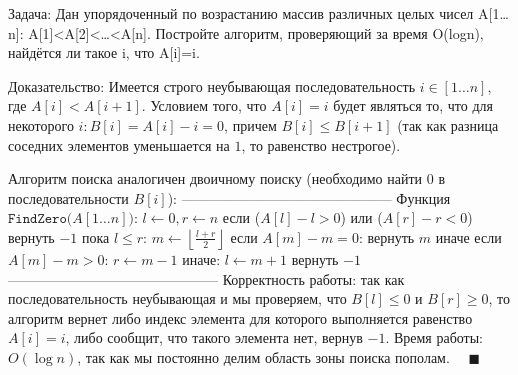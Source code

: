 Задача:
Дан упорядоченный по возрастанию массив различных целых чисел A[1…n]: A[1]<A[2]<…<A[n].
Постройте алгоритм, проверяющий за время O(logn), найдётся ли такое i, что A[i]=i.

Доказательство:
Имеется строго неубывающая последовательность $i \in [1 \ldots n]$, где $A[i] < A[i + 1]$.
Условием того, что $A[i] = i$ будет являться то, что для некоторого $i \colon
B[i] = A[i] - i = 0$, причем $B[i] \leq B[i + 1]$ (так как разница соседних элементов уменьшается на $1$, то равенство нестрогое).

Алгоритм поиска аналогичен двоичному поиску (необходимо найти 0 в последовательности $B[i]$):
---------------------------------------------
Функция $\texttt{FindZero($A[1 \ldots n]$)}$:
$l \leftarrow 0, r \leftarrow n$
если ($A[l] - l > 0$) или ($A[r] - r < 0$)
    вернуть $-1$
пока $l \leq r$:
    $m \leftarrow \left \lfloor {\frac{l + r}{2}} \right \rfloor$
    если $A[m] - m = 0$:
        вернуть $m$
    иначе если $A[m] - m > 0$:
        $r \leftarrow m - 1$
    иначе:
        $l \leftarrow m + 1$
вернуть $-1$
---------------------------------------------
Корректность работы: так как последовательность неубывающая и мы проверяем, что $B[l] \leq 0$ и $B[r] \geq 0$, то алгоритм
вернет либо индекс элемента для которого выполняется равенство $A[i] = i$, либо сообщит, что такого элемента нет, вернув $-1$.
Время работы: $O(\log{n})$, так как мы постоянно делим область зоны поиска пополам. $\quad\blacksquare$